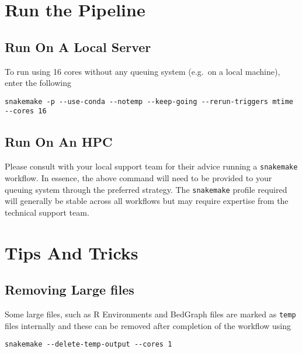 \documentclass[
]{book}
\begin{document}
\hypertarget{quick-run}{%
\section{Run the Pipeline}\label{quick-run}}

\hypertarget{run-on-a-local-server}{%
\subsection{Run On A Local Server}\label{run-on-a-local-server}}

To run using 16 cores without any queuing system (e.g.~on a local machine), enter the following

\begin{verbatim}
snakemake -p --use-conda --notemp --keep-going --rerun-triggers mtime --cores 16
\end{verbatim}

\hypertarget{run-on-an-hpc}{%
\subsection{Run On An HPC}\label{run-on-an-hpc}}

Please consult with your local support team for their advice running a \texttt{snakemake} workflow.
In essence, the above command will need to be provided to your queuing system through the preferred strategy.
The \texttt{snakemake} profile required will generally be stable across all workflows but may require expertise from the technical support team.

\hypertarget{tips-and-tricks}{%
\section{Tips And Tricks}\label{tips-and-tricks}}

\hypertarget{removing-large-files}{%
\subsection{Removing Large files}\label{removing-large-files}}

Some large files, such as R Environments and BedGraph files are marked as \texttt{temp} files internally and these can be removed after completion of the workflow using

\begin{verbatim}
snakemake --delete-temp-output --cores 1
\end{verbatim}
\end{document}
